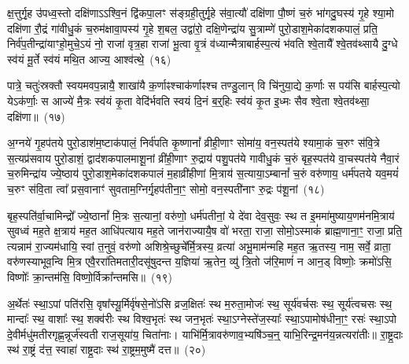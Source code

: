 क्ष॒त्तुर्गृ॒ह उ॑पध्व॒स्तो दक्षि॑णा\-ऽ\-ऽश्वि॒नं द्वि॑कपा॒लꣳ स॑ङ्ग्रही॒तुर्गृ॒हे स॑वा॒त्यौ॑ दक्षि॑णा पौ॒ष्णं च॒रुं भा॑गदु॒घस्य॑ गृ॒हे श्या॒मो दक्षि॑णा रौ॒द्रं गा॑वीधु॒कं च॒रुम॑क्षावा॒पस्य॑ गृ॒हे श॒बल॒ उद्वा॑रो॒ दक्षि॒णेन्द्रा॑य सु॒त्राम्णे॑ पुरो॒डाश॒मेका॑\-दश\-कपालं॒ प्रति॒ निर्व॑प॒तीन्द्रा॑याꣳहो॒मुचे॒\-ऽयं नो॒ राजा॑ वृत्र॒हा राजा॑ भू॒त्वा वृ॒त्रं व॑ध्यान्मैत्राबार्\mbox{}हस्प॒त्यं भ॑वति श्वे॒तायै᳚ श्वे॒तव॑थ्सायै दु॒ग्धे स्व॑यं मू॒र्ते स्व॑यं मथि॒त आज्य॒ आश्व॑त्थे॒~(१६)

पात्रे॒ चतुः॑स्रक्तौ स्वयमवप॒न्नायै॒ शाखा॑यै क॒र्णाꣴश्चा\-क॑र्णाꣴश्च तण्डु॒लान् वि चि॑नुया॒द्ये क॒र्णाः स पय॑सि बार्\mbox{}हस्प॒त्यो ये\-ऽक॑र्णाः॒ स आज्ये॑ मै॒त्रः स्व॑यं कृ॒ता वेदि॑र्भवति स्वयं दि॒नं ब॒र्॒\mbox{}हिः स्व॑यं कृ॒त इ॒ध्मः सैव श्वे॒ता श्वे॒तव॑थ्सा॒ दक्षि॑णा॥~(१७)


{\anuvakamend[{सा॒वि॒त्रं द्वाद॑श\-कपाल॒माश्व॑त्थे॒ त्रय॑स्त्रिꣳशच्च}]}%

अ॒ग्नये॑ गृ॒हप॑तये पुरो॒डाश॑\-म॒ष्टा\-क॑पालं॒ निर्व॑पति कृ॒ष्णानां᳚ व्रीही॒णाꣳ सोमा॑य॒ वन॒स्पत॑ये श्यामा॒कं च॒रुꣳ स॑वि॒त्रे स॒त्यप्र॑सवाय पुरो॒डाशं॒ द्वाद॑श\-कपालमाशू॒नां व्री॑ही॒णाꣳ रु॒द्राय॑ पशु॒पत॑ये गावीधु॒कं च॒रुं बृह॒स्पत॑ये वा॒चस्पत॑ये नैवा॒रं च॒रुमिन्द्रा॑य ज्ये॒ष्ठाय॑ पुरो॒डाश॒मेका॑\-दश\-कपालं म॒हाव्री॑हीणां मि॒त्राय॑ स॒त्याया॒\-ऽम्बानां᳚ च॒रुं वरु॑णाय॒ धर्म॑पतये यव॒मयं॑ च॒रुꣳ स॑वि॒ता त्वा᳚ प्रस॒वानाꣳ॑ सुवताम॒ग्निर्गृ॒हप॑तीना॒ꣳ॒ सोमो॒ वन॒स्पती॑नाꣳ रु॒द्रः प॑शू॒नां~(१८)

बृह॒स्पति॑र्वा॒चामिन्द्रो᳚ ज्ये॒ष्ठानां᳚ मि॒त्रः स॒त्यानां॒ वरु॑णो॒ धर्म॑पतीनां॒ ये दे॑वा देव॒सुवः॒ स्थ त इ॒ममा॑मुष्याय॒णम॑\-नमि॒त्राय॑ सुवध्वं मह॒ते क्ष॒त्राय॑ मह॒त आधि॑पत्याय मह॒ते जान॑राज्यायै॒ष वो॑ भरता॒ राजा॒ सोमो॒\-ऽस्माकं॑ ब्राह्म॒णाना॒ꣳ॒ राजा॒ प्रति॒ त्यन्नाम॑ रा॒ज्यम॑धायि॒ स्वां त॒नुवं॒ वरु॑णो अशिश्रे॒च्छुचे᳚र्मि॒त्रस्य॒ व्रत्या॑ अभू॒माम॑न्महि मह॒त ऋ॒तस्य॒ नाम॒ सर्वे॒ व्राता॒ वरु॑णस्याभूव॒न्वि मि॒त्र एवै॒ररा॑तिमतारी॒दसू॑षुदन्त य॒ज्ञिया॑ ऋ॒तेन॒ व्यु॑ त्रि॒तो ज॑रि॒माणं॑ न आन॒ड् विष्णोः॒ क्रमो॑\-ऽसि॒ विष्णोः᳚ क्रा॒न्तम॑सि॒ विष्णो॒र्विक्रा᳚न्तमसि॥~(१९)

{\anuvakamend[{प॒शू॒नां व्राताः॒ पञ्च॑विꣳशतिश्च}]}%

अ॒र्थेतः॑ स्था॒\-ऽपां पति॑रसि॒ वृषा᳚स्यू॒र्मिर्वृ॑षसे॒नो॑\-ऽसि व्रज॒क्षितः॑ स्थ म॒रुता॒मोजः॑ स्थ॒ सूर्य॑वर्चसः स्थ॒ सूर्य॑त्वचसः स्थ॒ मान्दाः᳚ स्थ॒ वाशाः᳚ स्थ॒ शक्व॑रीः स्थ विश्व॒भृतः॑ स्थ जन॒भृतः॑ स्था॒\-ऽग्नेस्ते॑ज॒स्याः᳚ स्था॒\-ऽपामोष॑धीना॒ꣳ॒ रसः॑ स्था॒\-ऽपो दे॒वीर्मधु॑मतीरगृह्ण॒न्नूर्ज॑स्वती राज॒सूया॑य॒ चिता॑नाः। याभि॑र्मि॒त्रावरु॑णाव॒भ्यषि॑ञ्च॒न्॒ याभि॒रिन्द्र॒मन॑य॒न्नत्यरा॑तीः॥ रा॒ष्ट्र॒दाः स्थ॑ रा॒ष्ट्रं द॑त्त॒ स्वाहा॑ राष्ट्र॒दाः स्थ॑ रा॒ष्ट्रम॒मुष्मै॑ दत्त॥~(२०)

